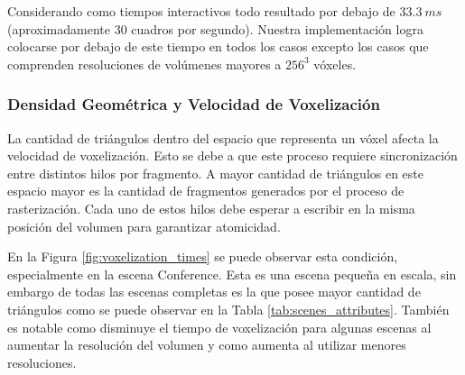 Considerando como tiempos interactivos todo resultado por debajo de $33.3\ ms$ (aproximadamente 30 cuadros por segundo). Nuestra implementación logra colocarse por debajo de este tiempo en todos los casos excepto los casos que comprenden resoluciones de volúmenes mayores a $256^3$ vóxeles.

\subsubsection{Densidad Geométrica y Velocidad de Voxelización}
La cantidad de triángulos dentro del espacio que representa un vóxel afecta la velocidad de voxelización. Esto se debe a que este proceso requiere sincronización entre distintos hilos por fragmento. A mayor cantidad de triángulos en este espacio mayor es la cantidad de fragmentos generados por el proceso de rasterización. Cada uno de estos hilos debe esperar a escribir en la misma posición del volumen para garantizar atomicidad.

En la Figura \ref{fig:voxelization_times} se puede observar esta condición, especialmente en la escena Conference. Esta es una escena pequeña en escala, sin embargo de todas las escenas completas es la que posee mayor cantidad de triángulos como se puede observar en la Tabla \ref{tab:scenes_attributes}. También es notable como disminuye el tiempo de voxelización para algunas escenas al aumentar la resolución del volumen y como aumenta al utilizar menores resoluciones.

